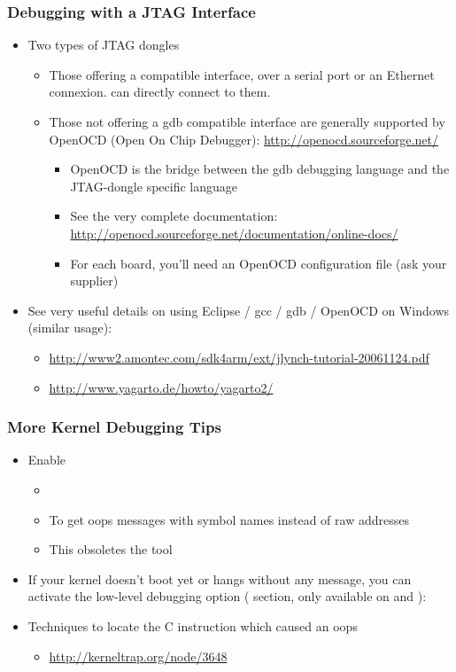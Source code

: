\begin{frame}
  \frametitle{Debugging with a JTAG Interface}
  \begin{itemize}
  \item Two types of JTAG dongles
    \begin{itemize}
    \item Those offering a  compatible interface, over a
      serial port or an Ethernet connexion.  can directly
      connect to them. \item Those not offering a gdb compatible interface are generally
      supported by OpenOCD (Open On Chip Debugger):
      \url{http://openocd.sourceforge.net/}
      \begin{itemize}
      \item OpenOCD is the bridge between the gdb debugging language
        and the JTAG-dongle specific language
      \item See the very complete documentation:
        \url{http://openocd.sourceforge.net/documentation/online-docs/}
      \item For each board, you'll need an OpenOCD configuration file
        (ask your supplier)
      \end{itemize}
    \end{itemize}
  \item See very useful details on using Eclipse / gcc / gdb / OpenOCD
    on Windows (similar usage):
    \begin{itemize}
    \item \url{http://www2.amontec.com/sdk4arm/ext/jlynch-tutorial-20061124.pdf}
    \item \url{http://www.yagarto.de/howto/yagarto2/}
    \end{itemize}
  \end{itemize}
\end{frame}

\begin{frame}
  \frametitle{More Kernel Debugging Tips}
  \begin{itemize}
  \item Enable 
    \begin{itemize}
    \item {}
    \item To get oops messages with symbol names instead of raw addresses
    \item This obsoletes the  tool
    \end{itemize}
  \item If your kernel doesn't boot yet or hangs without any message,
    you can activate the low-level debugging option
    ( section, only available on  and
    ): 
  \item Techniques to locate the C instruction which caused an oops
    \begin{itemize}
    \item \url{http://kerneltrap.org/node/3648}
    \end{itemize}
  \end{itemize}
\end{frame}

